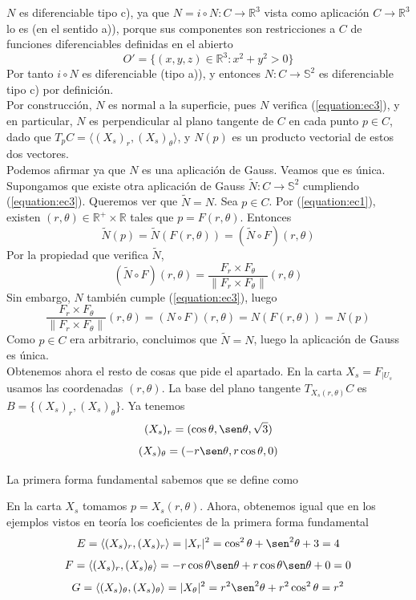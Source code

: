 \documentclass[12pt]{article}
\newcommand{\R}{\mathbb{R}}
\newcommand{\Rmas}{\R^{+}}
\newcommand{\Ss}{\mathbb{S}}
\newcommand{\norma}[1]{\lVert #1 \rVert}
\newcommand{\prodesc}[2]{\langle #1, #2 \rangle}
\begin{document}
\begin{ejercicio}
\begin{enumerate}
            $N$ es diferenciable tipo c), ya que $N = i \circ N : C \to \R^3$ vista como aplicación $C \to \R^3$
            lo es (en el sentido a)), porque sus componentes son restricciones a $C$ de funciones diferenciables definidas en el abierto
            $$O' = \{(x,y,z) \in \R^3 : x^2 + y^2 > 0\}$$
            Por tanto $i \circ N$ es diferenciable (tipo a)), y entonces $N : C \to \Ss^2$ es diferenciable tipo c) por definición. \\

            Por construcción, $N$ es normal a la superficie, pues $N$ verifica (\ref{equation:ec3}), y en particular, $N$ es perpendicular
            al plano tangente de $C$ en cada punto $p \in C$, dado que $T_p C = \langle (X_s)_r, (X_s)_\theta \rangle$, y $N(p)$ es un producto
            vectorial de estos dos vectores. \\

            Podemos afirmar ya que $N$ es una aplicación de Gauss. Veamos que es única. Supongamos que existe otra aplicación de Gauss
            $\tilde{N} : C \to \Ss^2$ cumpliendo (\ref{equation:ec3}). Queremos ver que $\tilde{N} = N$. Sea $p \in C$. Por (\ref{equation:ec1}),
            existen $(r, \theta) \in \Rmas \times \R$ tales que $p = F(r,\theta)$. Entonces
            $$\tilde{N}(p) = \tilde{N}(F(r,\theta)) = (\tilde{N} \circ F)(r, \theta)$$
            Por la propiedad que verifica $\tilde{N}$, 
            $$(\tilde{N} \circ F)(r, \theta) = \dfrac{F_r \times F_\theta}{\norma{F_r \times F_\theta}}(r,\theta)$$
            Sin embargo, $N$ también cumple (\ref{equation:ec3}), luego
            $$\dfrac{F_r \times F_\theta}{\norma{F_r \times F_\theta}}(r,\theta) = (N \circ F)(r, \theta) = N(F(r,\theta)) = N(p)$$
            Como $p \in C$ era arbitrario, concluimos que $\tilde{N} = N$, luego la aplicación de Gauss es única. \\

            Obtenemos ahora el resto de cosas que pide el apartado. En la carta $X_s = F_{|U_s}$ usamos las coordenadas $(r, \theta)$. 
            La base del plano tangente $T_{X_s(r,\theta)}C$ es $B = \{(X_s)_r, (X_s)_\theta\}$. Ya tenemos
            $$(X_s)_r = (\cos \theta, \sen \theta, \sqrt{3})$$
            $$(X_s)_\theta = (-r \sen \theta, r \cos \theta, 0)$$

            La primera forma fundamental sabemos que se define como \Func{g_p}{T_p C \times T_p C}{\R}{(v,w)}{g_p(v,w) := \prodesc{v}{w}}

            En la carta $X_s$ tomamos $p = X_s(r, \theta)$. Ahora, obtenemos igual que en los ejemplos vistos en teoría los coeficientes de 
            la primera forma fundamental
            $$E = \prodesc{(X_s)_r}{(X_s)_r} = |X_r|^2 = \cos^2 \theta + \sen^2 \theta + 3 = 4$$
            $$F = \prodesc{(X_s)_r}{(X_s)_\theta} = - r \cos \theta \sen \theta + r \cos \theta \sen \theta + 0 = 0$$
            $$G = \prodesc{(X_s)_\theta}{(X_s)_\theta} = |X_\theta|^2 = r^2 \sen^2 \theta + r^2 \cos^2 \theta = r^2$$


\end{enumerate}
\end{ejercicio}
\end{document}
